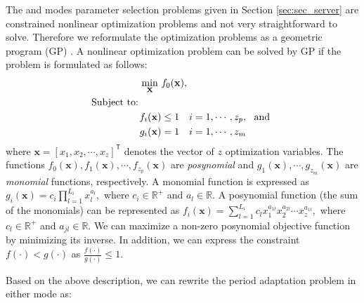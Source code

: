 
% 


The \ave and \pve modes parameter selection problems given in Section \ref{sec:sec_server} are constrained nonlinear optimization problems and 
not very straightforward to solve. Therefore we reformulate the optimization problems as a geometric program (GP) \cite{GP_tutorial}. A nonlinear optimization problem can be solved by GP if the problem is formulated as follows: \cite{GP_tutorial}
\begin{subequations}
\begin{align*}
\underset{\mathbf{X}}{\operatorname{min}}~ & f_0(\mathbf{x}),  \\
\text{~Subject to:~} \hspace*{2em} \nonumber \\
 f_i(\mathbf{x}) &\leq  1 \quad i = 1, \cdots, z_p,  \text{~~and~~} \\
 g_i(\mathbf{x}) &=  1 \quad i = 1, \cdots, z_m
\end{align*}
\end{subequations}
where $\mathbf{x} = [x_1, x_2, \cdots, x_z]^{\mathsf{T}}$ denotes the vector of $z$ optimization variables. The functions $f_0(\mathbf{x}), f_1(\mathbf{x}), \cdots, f_{z_p}(\mathbf{x})$ are \textit{posynomial} and $g_1(\mathbf{x}), \cdots, g_{z_m}(\mathbf{x})$ are \textit{monomial} functions, respectively. A monomial function is  expressed as
$
g_i(\mathbf{x}) = c_i \prod\limits_{l = 1}^{L_i} x_l^{a_l},
$
where $c_i \in \mathbb{R}^+$ and $a_l \in \mathbb{R}$. %
A posynomial function (\ie the sum of the monomials) can be represented as
$
f_i(\mathbf{x}) = \sum\limits_{l=1}^{L_i} c_l x_1^{a_{1l}} x_2^{a_{2l}} \cdots x_z^{a_{1l}},
$
where $c_l \in \mathbb{R}^+$ and $a_{jl} \in \mathbb{R}$. %
We can maximize a non-zero posynomial objective function by minimizing its inverse. In addition, we can express the constraint $f(\cdot) < g(\cdot)$ as $\frac{f(\cdot)}{g(\cdot)} \leq 1$.

Based on the above description, we can rewrite the period adaptation problem in either mode as:



